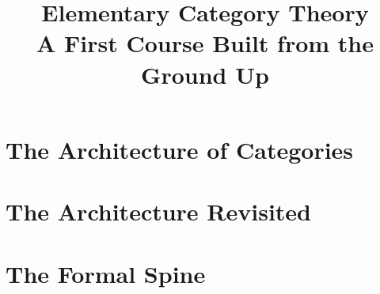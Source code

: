 \documentclass[10pt,oneside]{book}
\title{\Huge\bfseries\color{InformalColor} Elementary Category Theory\\[0.5em]
       \large A First Course Built from the Ground Up}
\author{}
\date{}
\begin{document}
\maketitle
\setcounter{tocdepth}{1}
\tableofcontents

\part{The Architecture of Categories}















\part{The Architecture Revisited}














\part{The Formal Spine}













\end{document}
